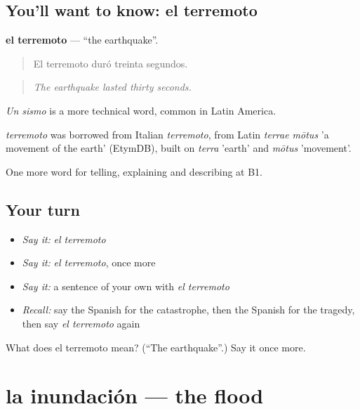 \subsection*{You'll want to know: el terremoto}
\textbf{el terremoto} — \textquotedblleft{}the earthquake\textquotedblright{}.

\begin{quote}
El terremoto duró treinta segundos.
\end{quote}

\begin{quote}
\emph{The earthquake lasted thirty seconds.}
\end{quote}

\emph{Un sismo} is a more technical word, common in Latin America.

\begin{cousinweb}
\emph{terremoto} was borrowed from Italian \emph{terremoto}, from Latin \emph{terrae mōtus} 'a movement of the earth' (EtymDB), built on \emph{terra} 'earth' and \emph{mōtus} 'movement'.
\end{cousinweb}

\begin{grammarlens}[title={What you've built}]
One more word for telling, explaining and describing at B1.
\end{grammarlens}

\subsection*{Your turn}
\begin{itemize}
\raggedright
  \item \emph{Say it:} \emph{el terremoto}
  \item \emph{Say it:} \emph{el terremoto}, once more
  \item \emph{Say it:} a sentence of your own with \emph{el terremoto}
  \item \emph{Recall:} say the Spanish for the catastrophe, then the Spanish for the tragedy, then say \emph{el terremoto} again
\end{itemize}

\begin{tcolorbox}[breakable,colback=teal!4,colframe=teal!35!black,title={Before you move on}]
What does el terremoto mean? (\textquotedblleft{}The earthquake\textquotedblright{}.) Say it once more.
\end{tcolorbox}
\section[la inundación]{la inundación — the flood}

